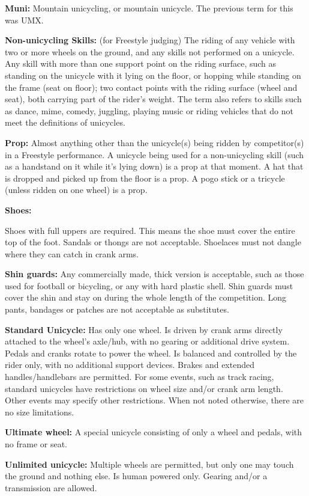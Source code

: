 \textbf{Muni:} Mountain unicycling, or mountain unicycle.
The previous term for this was UMX.

\textbf{Non-unicycling Skills:} (for Freestyle judging) The riding of any vehicle with two or more wheels on the ground, and any skills not performed on a unicycle.
Any skill with more than one support point on the riding surface, such as standing on the unicycle with it lying on the floor, or hopping while standing on the frame (seat on floor); two contact points with the riding surface (wheel and seat), both carrying part of the rider's weight.
The term also refers to skills such as dance, mime, comedy, juggling, playing music or riding vehicles that do not meet the definitions of unicycles.

\textbf{Prop:} Almost anything other than the unicycle(s) being ridden by competitor(s) in a Freestyle performance.
A unicycle being used for a non-unicycling skill (such as a handstand on it while it's lying down) is a prop at that moment.
A hat that is dropped and picked up from the floor is a prop.
A pogo stick or a tricycle (unless ridden on one wheel) is a prop.

\textbf{Shoes:} 

Shoes with full uppers are required.
This means the shoe must cover the entire top of the foot.
Sandals or thongs are not acceptable.
Shoelaces must not dangle where they can catch in crank arms.

\textbf{Shin guards:} Any commercially made, thick version is acceptable, such as those used for football or bicycling, or any with hard plastic shell.
Shin guards must cover the shin and stay on during the whole length of the competition.
Long pants, bandages or patches are not acceptable as substitutes.

\textbf{Standard Unicycle:} Has only one wheel.
Is driven by crank arms directly attached to the wheel's axle/hub, with no gearing or additional drive system.
Pedals and cranks rotate to power the wheel.
Is balanced and controlled by the rider only, with no additional support devices.
Brakes and extended handles/handlebars are permitted.
For some events, such as track racing, standard unicycles have restrictions on wheel size and/or crank arm length.
Other events may specify other restrictions.
When not noted otherwise, there are no size limitations.

\textbf{Ultimate wheel:} A special unicycle consisting of only a wheel and pedals, with no frame or seat.

\textbf{Unlimited unicycle:} Multiple wheels are permitted, but only one may touch the ground and nothing else.
Is human powered only.
Gearing and/or a transmission are allowed.

